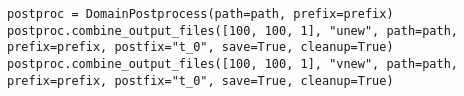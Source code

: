 \begin{lstlisting}[caption={Example post-processing.},captionpos=b, label={alg:ddpostproc}]
postproc = DomainPostprocess(path=path, prefix=prefix)
postproc.combine_output_files([100, 100, 1], "unew", path=path, prefix=prefix, postfix="t_0", save=True, cleanup=True)
postproc.combine_output_files([100, 100, 1], "vnew", path=path, prefix=prefix, postfix="t_0", save=True, cleanup=True)
\end{lstlisting}





